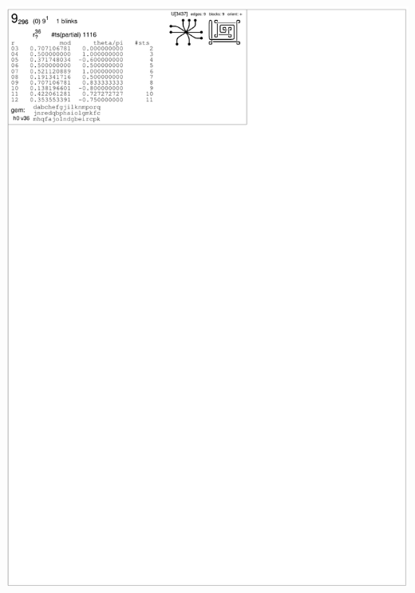\begin{center}
 \includegraphics[height=23.5cm]{E.figsbw2/catalog101_bw.pdf} \eject
\end{center}



